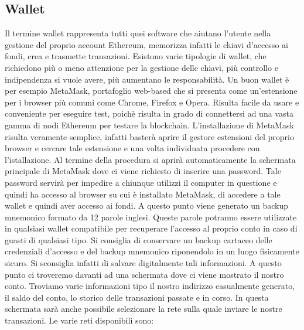 \subsection*{Wallet}
Il termine wallet rappresenta tutti quei software che aiutano l'utente nella gestione del proprio account Ethereum, memorizza infatti le chiavi d'accesso ai fondi, crea e trasmette transazioni. Esistono varie tipologie di wallet, che richiedono più o meno attenzione per la gestione delle chiavi, più controllo e indipendenza si vuole avere, più aumentano le responsabilità. Un buon wallet è per esempio MetaMask, portafoglio web-based che si presenta come un'estensione per i browser più comuni come Chrome, Firefox e Opera. Risulta facile da usare e conveniente per eseguire test, poichè risulta in grado di connettersi ad una vasta gamma di nodi Ethereum per testare la blockchain. L'installazione di MetaMask risulta veramente semplice, infatti basterà aprire il gestore estensioni del proprio browser e cercare tale estensione e una volta individuata procedere con l'istallazione. Al termine della procedura si aprirà automaticamente la schermata principale di MetaMask dove ci viene richiesto di inserire una password. Tale password servirà per impedire a chiunque utilizzi il computer in questione e quindi ha accesso al browser su cui è installato MetaMask, di accedere a tale wallet e quindi aver accesso ai fondi. A questo punto viene generato un backup mnemonico formato da 12 parole inglesi. Queste parole potranno essere utilizzate in qualsiasi wallet compatibile per recuperare l'accesso al proprio conto in caso di guasti di qualsiasi tipo. Si consiglia di conservare un backup cartaceo delle credenziali d'accesso e del backup mnemonico riponendolo in un luogo fisicamente sicuro. Si sconsiglia infatti di salvare digitalmente tali informazioni.
A questo punto ci troveremo davanti ad una schermata dove ci viene mostrato il nostro conto. Troviamo varie informazioni tipo il nostro indirizzo casualmente generato, il saldo del conto, lo storico delle transazioni passate e in corso. In questa schermata sarà anche possibile selezionare la rete sulla quale inviare le nostre transazioni. Le varie reti disponibili sono:
